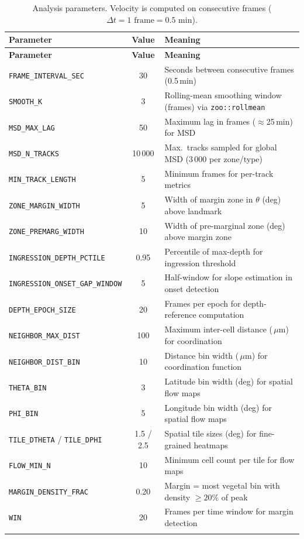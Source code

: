 \documentclass[11pt,a4paper]{article}
\newcommand{\um}{\,\mu\text{m}}
\newcommand{\param}[1]{\texttt{#1}}
\begin{document}
\begin{longtable}{l c p{7cm}}
\toprule
\textbf{Parameter} & \textbf{Value} & \textbf{Meaning} \\
\midrule
\endfirsthead
\toprule
\textbf{Parameter} & \textbf{Value} & \textbf{Meaning} \\
\midrule
\endhead
\param{FRAME\_INTERVAL\_SEC} & 30 & Seconds between consecutive frames (0.5\,min) \\
\param{SMOOTH\_K} & 3 & Rolling-mean smoothing window (frames) via \texttt{zoo::rollmean} \\
\param{MSD\_MAX\_LAG} & 50 & Maximum lag in frames ($\approx$25\,min) for MSD \\
\param{MSD\_N\_TRACKS} & 10\,000 & Max.\ tracks sampled for global MSD (3\,000 per zone/type) \\
\param{MIN\_TRACK\_LENGTH} & 5 & Minimum frames for per-track metrics \\
\param{ZONE\_MARGIN\_WIDTH} & 5 & Width of margin zone in $\theta$ (deg) above landmark \\
\param{ZONE\_PREMARG\_WIDTH} & 10 & Width of pre-marginal zone (deg) above margin zone \\
\param{INGRESSION\_DEPTH\_PCTILE} & 0.95 & Percentile of max-depth for ingression threshold \\
\param{INGRESSION\_ONSET\_GAP\_WINDOW} & 5 & Half-window for slope estimation in onset detection \\
\param{DEPTH\_EPOCH\_SIZE} & 20 & Frames per epoch for depth-reference computation \\
\param{NEIGHBOR\_MAX\_DIST} & 100 & Maximum inter-cell distance ($\um$) for coordination \\
\param{NEIGHBOR\_DIST\_BIN} & 10 & Distance bin width ($\um$) for coordination function \\
\param{THETA\_BIN} & 3 & Latitude bin width (deg) for spatial flow maps \\
\param{PHI\_BIN} & 5 & Longitude bin width (deg) for spatial flow maps \\
\param{TILE\_DTHETA} / \param{TILE\_DPHI} & 1.5 / 2.5 & Spatial tile sizes (deg) for fine-grained heatmaps \\
\param{FLOW\_MIN\_N} & 10 & Minimum cell count per tile for flow maps \\
\param{MARGIN\_DENSITY\_FRAC} & 0.20 & Margin = most vegetal bin with density $\ge 20\%$ of peak \\
\param{WIN} & 20 & Frames per time window for margin detection \\
\bottomrule
\caption{Analysis parameters.  Velocity is computed on consecutive frames
($\Delta t = 1\text{ frame} = 0.5\text{ min}$).}
\label{tab:params_table}
\end{longtable}
\end{document}
